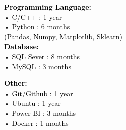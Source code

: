 \documentclass[10pt,a4paper,ragged2e,withhyper]{altacv}
\begin{document}
\begin{paracol}{2}
            \textcolor{black}{\textbf{Programming Language:}}\\
            \vspace{0.8em}
            \hspace{3em} • \hspace{0.5em} \textcolor{black}{C/C++ : 1 year} \\
            \vspace{0.5em}
            \hspace{3em} • \hspace{0.5em} \textcolor{black}{Python : 6 months} \\
            \vspace{0.5em}
            \hspace{1.5em} \textcolor{black}{(Pandas, Numpy, Matplotlib, Sklearn)} \\
            \vspace{0.8em}
            \textcolor{black}{\textbf{Database:}} \\
            \vspace{0.8em}
            \hspace{3em} • \hspace{0.5em} \textcolor{black}{SQL Sever : 8 months} \\
            \vspace{0.5em}
            \hspace{3em} • \hspace{0.5em} \textcolor{black}{MySQL : 3 months} \\
            \vspace{0.8em}

            \textcolor{black}{\textbf{Other:}} \\
            \vspace{0.8em}
            \hspace{3em} • \hspace{0.5em} \textcolor{black}{Git/Github : 1 year} \\
            \vspace{0.5em}
            \hspace{3em} • \hspace{0.5em} \textcolor{black}{Ubuntu : 1 year} \\
            \vspace{0.5em}
            \hspace{3em} • \hspace{0.5em} \textcolor{black}{Power BI : 3 months} \\
            \vspace{0.5em}
            \hspace{3em} • \hspace{0.5em} \textcolor{black}{Docker : 1 months} \\
        

\end{paracol}
\end{document}
